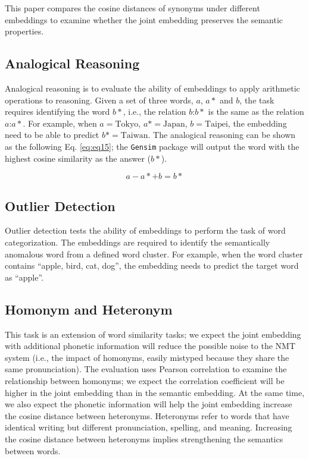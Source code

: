 This paper compares the cosine distances of synonyms under different embeddings to examine whether the joint embedding preserves the semantic properties.

\subsection{Analogical Reasoning} \label{sec:analogy}

Analogical reasoning is to evaluate the ability of embeddings to apply arithmetic operations to reasoning. Given a set of three words, $a$, $a*$ and $b$, the task requires identifying the word $b*$, i.e., the relation $b$:$b*$ is the same as the relation $a$:$a*$. For example, when $a=\text{Tokyo}$, $a*=\text{Japan}$, $b=\text{Taipei}$, the embedding need to be able to predict $b*=\text{Taiwan}$. The analogical reasoning can be shown as the following Eq. \ref{eq:eq15}; the \texttt{Gensim} package will output the word with the highest cosine similarity as the answer ($b*$).

\begin{equation}
    a - a* + b = b* \label{eq:eq15}
\end{equation}

\subsection{Outlier Detection} \label{sec:outlier}

Outlier detection tests the ability of embeddings to perform the task of word categorization. The embeddings are required to identify the semantically anomalous word from a defined word cluster. For example, when the word cluster contains ``apple, bird, cat, dog'', the embedding needs to predict the target word as ``apple''.

\subsection{Homonym and Heteronym} \label{sec:homonym_heteronym}

This task is an extension of word similarity tasks; we expect the joint embedding with additional phonetic information will reduce the possible noise to the NMT system (i.e., the impact of homonyms, easily mistyped because they share the same pronunciation). The evaluation uses Pearson correlation to examine the relationship between homonyms; we expect the correlation coefficient will be higher in the joint embedding than in the semantic embedding. At the same time, we also expect the phonetic information will help the joint embedding increase the cosine distance between heteronyms. Heteronyms refer to words that have identical writing but different pronunciation, spelling, and meaning. Increasing the cosine distance between heteronyms implies strengthening the semantics between words.